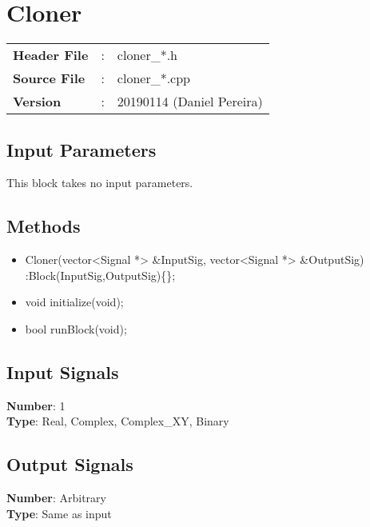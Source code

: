 \clearpage

\section{Cloner}
\label{sec:cloner}
\begin{refsection}

\begin{tcolorbox}	
\begin{tabular}{p{2.75cm} p{0.2cm} p{10.5cm}} 	
\textbf{Header File}    &:& cloner\_*.h \\
\textbf{Source File}    &:& cloner\_*.cpp \\
\textbf{Version}        &:& 20190114 (Daniel Pereira)
\end{tabular}
\end{tcolorbox}

\subsection*{Input Parameters}

This block takes no input parameters.


\subsection*{Methods}

\begin{itemize}
  \item Cloner(vector<Signal *> \&InputSig, vector<Signal *> \&OutputSig) :Block(InputSig,OutputSig)\{\};
  \item void initialize(void);
  \item bool runBlock(void);
\end{itemize}




\subsection*{Input Signals}

\textbf{Number}: 1\\
\textbf{Type}: Real, Complex, Complex\_XY, Binary


\subsection*{Output Signals}

\textbf{Number}: Arbitrary\\
\textbf{Type}: Same as input


\end{refsection}

